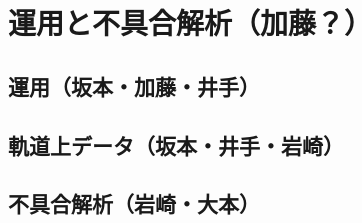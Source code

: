 \chapter{運用と不具合解析（加藤？）}
\label{chap:operation}

%

\section{運用（坂本・加藤・井手）}

\section{軌道上データ（坂本・井手・岩崎）}

\section{不具合解析（岩崎・大本）}